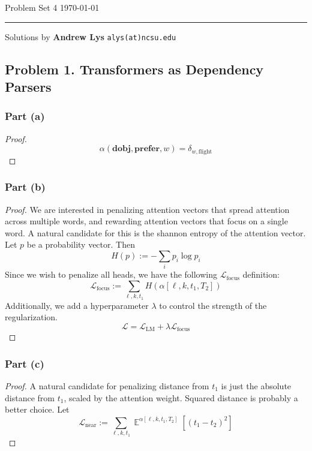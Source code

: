 \documentclass{amsart}
\newcommand{\cL}{\mathcal{L}}
\DeclareMathOperator{\ee}{\mathbb{E}}
\theoremstyle{definition}
\begin{document}
\noindent
Problem Set 4  \hfill \today  %
\smallskip
\hrule
\smallskip
\noindent
Solutions by {\bf Andrew Lys} \qquad   %
  {\tt alys(at)ncsu.edu}

\vspace{0.5cm}
\subsection*{Problem 1. Transformers as Dependency Parsers}
\subsubsection*{Part (a)} 
\begin{proof}
    \[
    \alpha(\mathbf{dobj}, \mathbf{prefer}, w) = \delta_{w, \text{flight}}
    \]
\end{proof}
\subsubsection*{Part (b)}
\begin{proof}
    We are interested in penalizing attention vectors that spread attention across multiple words, 
    and rewarding attention vectors that focus on a single word. 
    A natural candidate for this is the shannon entropy of the attention vector. Let $p$ be a probability vector. Then
    \[
    H(p) := -\sum_{i} p_i \log p_i
    \] 
    Since we wish to penalize all heads, we have the following $\cL_{\text{focus}}$ definition:
    \[
    \cL_{\text{focus}} := \sum_{\ell, k, t_1} H(\alpha[\ell, k, t_1, T_2])
    \]
    Additionally, we add a hyperparameter $\lambda$ to control the strength of the regularization.
    \[
    \cL = \cL_{\text{LM}} + \lambda \cL_{\text{focus}}
    \]
\end{proof}

\subsubsection*{Part (c)}
\begin{proof}
    A natural candidate for penalizing distance from $t_1$ is just the absolute distance from $t_1$, scaled by the attention weight. 
    Squared distance is probably a better choice. Let 
    \[
    \cL_{\text{near}} := \sum_{\ell, k, t_1} \ee^{\alpha[\ell, k, t_1, T_2]}[(t_1 - t_2)^2]
    \]
\end{proof}
\end{document}
